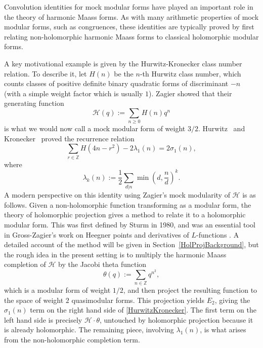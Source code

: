 \documentclass[11pt,reqno]{amsart}
\newcommand{\Z}{\mathbb{Z}}
\renewcommand{\=}{\;=\;}
\theoremstyle{myremark}
\begin{document}
Convolution identities for mock modular forms have played an important role in the theory of harmonic Maass forms. 
As with many arithmetic properties of mock modular forms, such as congruences, these identities are typically proved by first relating non-holomorphic harmonic Maass forms to classical holomorphic modular forms. 

A key motivational example is given by the Hurwitz-Kronecker class number relation. 
To describe it, let $H(n)$ be the $n$-th Hurwitz class number, which counts classes of positive definite binary quadratic forms of discriminant $-n$ (with a simple weight factor which is usually $1$). 
Zagier showed \cite{Zagier75} that their generating function 
\[
\mathcal H(q):=\sum_{n\geq0}H(n)q^n
\]
is what we would now call a mock modular form of weight $3/2$. Hurwitz~\cite{Hurwitz} and Kronecker~\cite{Kronecker} proved the recurrence relation
\begin{equation}\label{HurwitzKronecker}
\sum_{r\in\Z}H(4n-r^2)-2\lambda_1(n)=2\sigma_1(n)
,
\end{equation}
where
$$
\lambda_k(n):=\frac12\sum_{d|n}\min\left(d,\frac nd\right)^k
.
$$
A modern perspective on this identity using Zagier's mock modularity of $\mathcal H$ is as follows. 
Given a non-holomorphic function transforming as a modular form, the theory of holomorphic projection gives a method to relate it to a holomorphic modular form. This was first defined by Sturm \cite{Sturm474} in 1980, and was an essential tool in Gross-Zagier's work on Heegner points and derivatives of $L$-functions \cite{Zagier241}.
A detailed account of the method will be given in Section~\ref{HolProjBackground}, 
but the rough idea in the present setting is to multiply the harmonic Maass completion of $\mathcal H$ by the Jacobi theta function 
\[
\theta(q):=\sum_{n\in\Z}q^{n^2},
\]
which is a modular form of weight $1/2$, and then project the resulting function to the space of weight $2$ quasimodular forms. 
This projection yields $E_2$, giving the $\sigma_1(n)$ term on the right hand side of \eqref{HurwitzKronecker}. 
The first term on the left hand side is precisely $\mathcal H\cdot\theta$, untouched by holomorphic projection because it is already holomorphic. 
The remaining piece, involving $\lambda_1(n)$, is what arises from the non-holomorphic completion term. 
\end{document}
